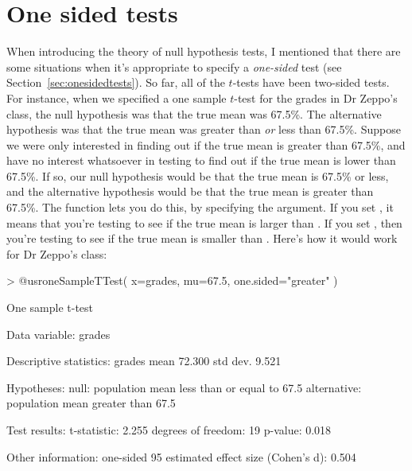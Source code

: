\section{One sided tests}

When introducing the theory of null hypothesis tests, I mentioned that there are some situations when it's appropriate to specify a {\it one-sided} test (see Section~\ref{sec:onesidedtests}). So far, all of the $t$-tests have been two-sided tests. For instance, when we specified a one sample $t$-test for the grades in Dr Zeppo's class, the null hypothesis was that the true mean was 67.5\%. The alternative hypothesis was that the true mean was greater than {\it or} less than 67.5\%. Suppose we were only interested in finding out if the true mean is greater than 67.5\%, and have no interest whatsoever in testing to find out if the true mean is lower than 67.5\%. If so, our null hypothesis would be that the true mean is 67.5\% or less, and the alternative hypothesis would be that the true mean is greater than 67.5\%. The  function lets you do this, by specifying the  argument. If you set , it means that you're testing to see if the true mean is larger than . If you set , then you're testing to see if the true mean is smaller than . Here's how it would work for Dr Zeppo's class:
\begin{rblock1}
> @usr{oneSampleTTest( x=grades, mu=67.5, one.sided="greater" )}

   One sample t-test 

Data variable:   grades 

Descriptive statistics: 
            grades
   mean     72.300
   std dev.  9.521

Hypotheses: 
   null:        population mean less than or equal to 67.5 
   alternative: population mean greater than 67.5 

Test results: 
   t-statistic:  2.255 
   degrees of freedom:  19 
   p-value:  0.018 

Other information: 
   one-sided 95%
   estimated effect size (Cohen's d):  0.504 
\end{rblock1}
